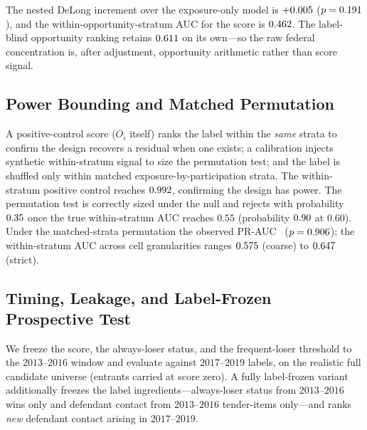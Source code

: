 The nested DeLong increment over the exposure-only model is
$+0.005$ ($p=0.191$), and the
within-opportunity-stratum AUC for the score is $0.462$. The
label-blind opportunity ranking retains $0.611$ on its
own---so the raw federal concentration is, after adjustment, opportunity
arithmetic rather than score signal.

\subsection{Power Bounding and Matched Permutation}
\label{supp:federal_power_permutation}

A positive-control score ($O_i$ itself) ranks the label within the
\emph{same} strata to confirm the design recovers a residual when one
exists; a calibration injects synthetic within-stratum signal to size the
permutation test; and the label is shuffled only within matched
exposure-by-participation strata. The within-stratum positive control
reaches $0.992$, confirming the design has power. The
permutation test is correctly sized under the null and rejects with
probability $0.35$ once the true within-stratum AUC reaches
$0.55$ (probability $0.90$ at $0.60$). Under the
matched-strata permutation the observed PR-AUC \valFedAudPermVerdict\
($p=0.906$); the within-stratum AUC across cell granularities
ranges $0.575$ (coarse) to $0.647$
(strict).

\subsection{Timing, Leakage, and Label-Frozen Prospective Test}
\label{supp:federal_timing}

We freeze the score, the always-loser status, and the frequent-loser
threshold to the $2013$--$2016$ window and evaluate against $2017$--$2019$
labels, on the realistic full candidate universe (entrants carried at score
zero). A fully label-frozen variant additionally freezes the label
ingredients---always-loser status from $2013$--$2016$ wins only and
defendant contact from $2013$--$2016$ tender-items only---and ranks
\emph{new} defendant contact arising in $2017$--$2019$.

